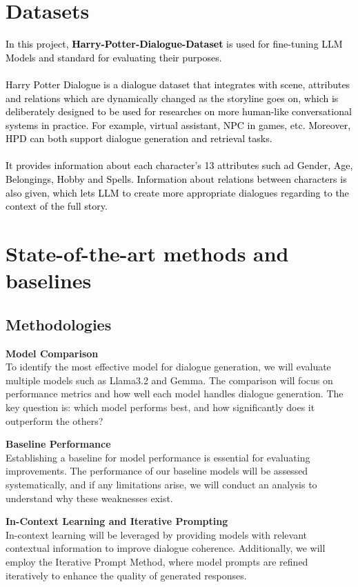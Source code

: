 \documentclass{article}
\begin{document}
\section{Datasets}
\textcolor{black}{In this project, \textbf{Harry-Potter-Dialogue-Dataset} is used for fine-tuning LLM Models and standard for evaluating their purposes.}\\\\
\textcolor{black}{Harry Potter Dialogue is a dialogue dataset that integrates with scene, attributes and relations which are dynamically changed as the storyline goes on, which is deliberately designed to be used for researches on more human-like conversational systems in practice. For example, virtual assistant, NPC in games, etc. Moreover, HPD can both support dialogue generation and retrieval tasks.}\\\\
\textcolor{black}{It provides information about each character's 13 attributes such ad Gender, Age, Belongings, Hobby and Spells. Information about relations between characters is also given, which lets LLM to create more appropriate dialogues regarding to the context of the full story.}

\section{State-of-the-art methods and baselines}

\subsection{Methodologies}

\textbf{Model Comparison} \\
To identify the most effective model for dialogue generation, we will evaluate multiple models such as Llama3.2 and Gemma. The comparison will focus on performance metrics and how well each model handles dialogue generation. The key question is: which model performs best, and how significantly does it outperform the others?

\textbf{Baseline Performance} \\
Establishing a baseline for model performance is essential for evaluating improvements. The performance of our baseline models will be assessed systematically, and if any limitations arise, we will conduct an analysis to understand why these weaknesses exist.

\textbf{In-Context Learning and Iterative Prompting} \\
In-context learning will be leveraged by providing models with relevant contextual information to improve dialogue coherence. Additionally, we will employ the Iterative Prompt Method, where model prompts are refined iteratively to enhance the quality of generated responses.
\end{document}
